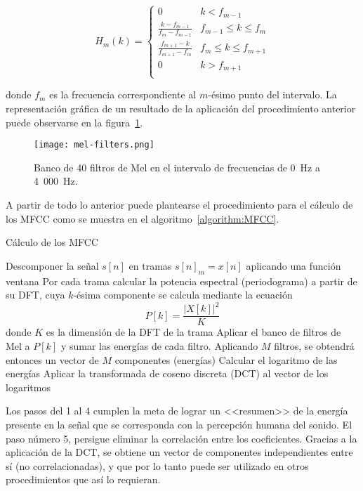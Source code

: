 \begin{equation}
    \label{eq:Mel filterbank}
    H_m(k) = \begin{cases}
                 0 & k < f_{m-1} \\
                 \frac{k-f_{m-1}}{f_m - f_{m-1}} & f_{m-1}\leq k\leq f_m \\
                 \frac{f_{m+1}-k}{f_{m+1}-f_m} & f_m \leq k\leq f_{m+1} \\
                 0 & k > f_{m+1} \\
    \end{cases}
\end{equation}

\noindent
donde $f_m$ es la frecuencia correspondiente al $m$-ésimo punto del intervalo.
La representación gráfica de un resultado de la aplicación del procedimiento anterior puede observarse en la figura~\ref{img:mel-filters}.

\begin{figure}[!h]
    \centering
    \texttt{[image: mel-filters.png]}
    \caption{Banco de 40 filtros de Mel en el intervalo de frecuencias de 0~Hz a 4~000~Hz.}
    \label{img:mel-filters}
\end{figure}

A partir de todo lo anterior puede plantearse el procedimiento para el cálculo de los MFCC como se muestra en el algoritmo~\ref{algorithm:MFCC}.

\begin{algorithm}
    \caption{Cálculo de los MFCC}
    \label{algorithm:MFCC}
    Descomponer la señal $s[n]$ en tramas $s[n]_m = x[n]$ aplicando una función ventana\;
    Por cada trama calcular la potencia espectral (periodograma) a partir de su DFT, cuya $k$-ésima componente se calcula mediante la ecuación
    \begin{equation*}
        P[k] = \frac{|X[k]|^2}{K}
    \end{equation*}
    donde $K$ es la dimensión de la DFT de la trama\;
    Aplicar el banco de filtros de Mel a $P[k]$ y sumar las energías de cada filtro.
    Aplicando $M$ filtros, se obtendrá entonces un vector de $M$ componentes (energías)\;
    Calcular el logaritmo de las energías\;
    Aplicar la transformada de coseno discreta (DCT) al vector de los logaritmos\;
\end{algorithm}

Los pasos del 1 al 4 cumplen la meta de lograr un <<resumen>> de la energía presente en la señal que se corresponda con la percepción humana del sonido.
El paso número 5, persigue eliminar la correlación entre los coeficientes.
Gracias a la aplicación de la DCT, se obtiene un vector de componentes independientes entre sí (no correlacionadas), y que por lo tanto puede ser utilizado en otros procedimientos que así lo requieran.


